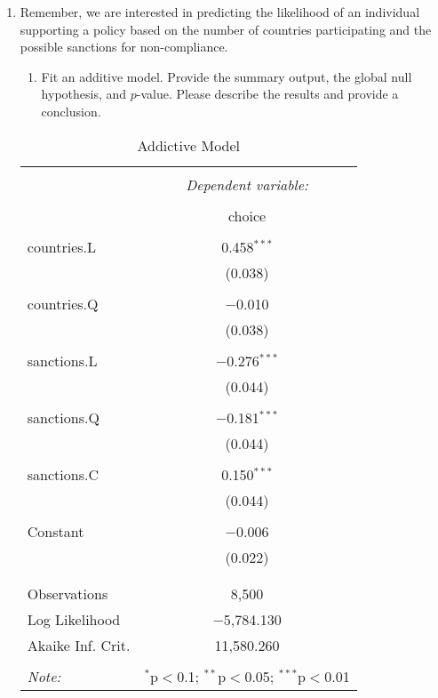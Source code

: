 \documentclass[12pt,letterpaper]{article}
\begin{document}
\begin{enumerate}
	\item
	Remember, we are interested in predicting the likelihood of an individual supporting a policy based on the number of countries participating and the possible sanctions for non-compliance.
	\begin{enumerate}
		\item [] Fit an additive model. Provide the summary output, the global null hypothesis, and $p$-value. Please describe the results and provide a conclusion.
	\end{enumerate}
	
	\begin{table}[!htbp] \centering 
		\caption{Addictive Model} 
		\label{} 
		\begin{tabular}{@{\extracolsep{5pt}}lc} 
			\\[-1.8ex]\hline 
			\hline \\[-1.8ex] 
			& \multicolumn{1}{c}{\textit{Dependent variable:}} \\ 
			\cline{2-2} 
			\\[-1.8ex] & choice \\ 
			\hline \\[-1.8ex] 
			countries.L & 0.458$^{***}$ \\ 
			& (0.038) \\ 
			& \\ 
			countries.Q & $-$0.010 \\ 
			& (0.038) \\ 
			& \\ 
			sanctions.L & $-$0.276$^{***}$ \\ 
			& (0.044) \\ 
			& \\ 
			sanctions.Q & $-$0.181$^{***}$ \\ 
			& (0.044) \\ 
			& \\ 
			sanctions.C & 0.150$^{***}$ \\ 
			& (0.044) \\ 
			& \\ 
			Constant & $-$0.006 \\ 
			& (0.022) \\ 
			& \\ 
			\hline \\[-1.8ex] 
			Observations & 8,500 \\ 
			Log Likelihood & $-$5,784.130 \\ 
			Akaike Inf. Crit. & 11,580.260 \\ 
			\hline 
			\hline \\[-1.8ex] 
			\textit{Note:}  & \multicolumn{1}{r}{$^{*}$p$<$0.1; $^{**}$p$<$0.05; $^{***}$p$<$0.01} \\ 
		\end{tabular} 
	\end{table} 


\end{enumerate}
\end{document}
